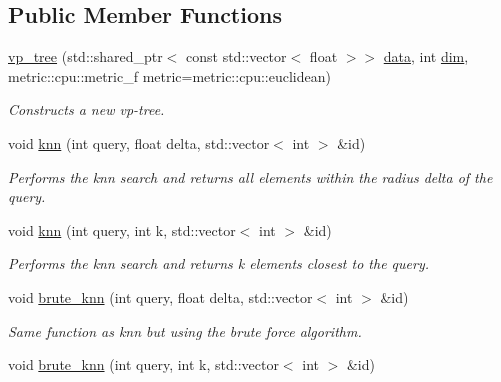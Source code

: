 \subsection*{Public Member Functions}
\begin{DoxyCompactItemize}
\item 
\hyperlink{classtree_1_1cpu_1_1vp__tree_ac374600ef88cda498f56c0c74507b9da}{vp\+\_\+tree} (std\+::shared\+\_\+ptr$<$ const std\+::vector$<$ float $>$$>$ \hyperlink{classtree_1_1vp__tree_a0ac835729832f805cfde6375891f9073}{data}, int \hyperlink{classtree_1_1vp__tree_a9654dfc1b8ec7db0718f3d98a9efe5e1}{dim}, metric\+::cpu\+::metric\+\_\+f metric=metric\+::cpu\+::euclidean)
\begin{DoxyCompactList}\small\item\em Constructs a new vp-\/tree. \end{DoxyCompactList}\item 
void \hyperlink{classtree_1_1cpu_1_1vp__tree_ab2956b54f9bfae552ee353b63b518d9f}{knn} (int query, float delta, std\+::vector$<$ int $>$ \&id)
\begin{DoxyCompactList}\small\item\em Performs the knn search and returns all elements within the radius delta of the query. \end{DoxyCompactList}\item 
\hypertarget{classtree_1_1cpu_1_1vp__tree_a42daa91934422c544b2d3234d6f4b4c1}{}void \hyperlink{classtree_1_1cpu_1_1vp__tree_a42daa91934422c544b2d3234d6f4b4c1}{knn} (int query, int k, std\+::vector$<$ int $>$ \&id)\label{classtree_1_1cpu_1_1vp__tree_a42daa91934422c544b2d3234d6f4b4c1}

\begin{DoxyCompactList}\small\item\em Performs the knn search and returns k elements closest to the query. \end{DoxyCompactList}\item 
\hypertarget{classtree_1_1cpu_1_1vp__tree_a6b4257008f872348b15ec221b6e74348}{}void \hyperlink{classtree_1_1cpu_1_1vp__tree_a6b4257008f872348b15ec221b6e74348}{brute\+\_\+knn} (int query, float delta, std\+::vector$<$ int $>$ \&id)\label{classtree_1_1cpu_1_1vp__tree_a6b4257008f872348b15ec221b6e74348}

\begin{DoxyCompactList}\small\item\em Same function as knn but using the brute force algorithm. \end{DoxyCompactList}\item 
\hypertarget{classtree_1_1cpu_1_1vp__tree_a417aef52e44c4b1f8b5d778e8e251be3}{}void \hyperlink{classtree_1_1cpu_1_1vp__tree_a417aef52e44c4b1f8b5d778e8e251be3}{brute\+\_\+knn} (int query, int k, std\+::vector$<$ int $>$ \&id)\label{classtree_1_1cpu_1_1vp__tree_a417aef52e44c4b1f8b5d778e8e251be3}


\end{DoxyCompactItemize}
